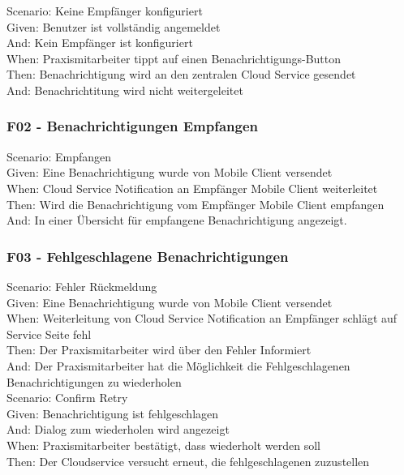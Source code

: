         Scenario: Keine Empfänger konfiguriert\\
        Given:  Benutzer ist vollständig angemeldet\\
        And:    Kein Empfänger ist konfiguriert\\
        When:   Praxismitarbeiter tippt auf einen Benachrichtigungs-Button\\
        Then:   Benachrichtigung wird an den zentralen Cloud Service gesendet\\
        And:    Benachrichtitung wird nicht weitergeleitet\\

    \subsubsection*{F02 - Benachrichtigungen Empfangen}

        Scenario: Empfangen\\
        Given:  Eine Benachrichtigung wurde von Mobile Client versendet\\
        When:   Cloud Service Notification an Empfänger Mobile Client weiterleitet\\
        Then:   Wird die Benachrichtigung vom Empfänger Mobile Client empfangen\\
        And:    In einer Übersicht für empfangene Benachrichtigung angezeigt.\\


    \subsubsection*{F03 - Fehlgeschlagene Benachrichtigungen}

        Scenario: Fehler Rückmeldung\\
        Given:  Eine Benachrichtigung wurde von Mobile Client versendet\\
        When:   Weiterleitung von Cloud Service Notification an Empfänger schlägt auf Service Seite fehl\\
        Then:   Der Praxismitarbeiter wird über den Fehler Informiert\\
        And:    Der Praxismitarbeiter hat die Möglichkeit die Fehlgeschlagenen Benachrichtigungen zu wiederholen\\

        Scenario: Confirm Retry\\
        Given:  Benachrichtigung ist fehlgeschlagen\\
        And:    Dialog zum wiederholen wird angezeigt\\
        When:   Praxismitarbeiter bestätigt, dass wiederholt werden soll\\
        Then:   Der Cloudservice versucht erneut, die fehlgeschlagenen zuzustellen\\

